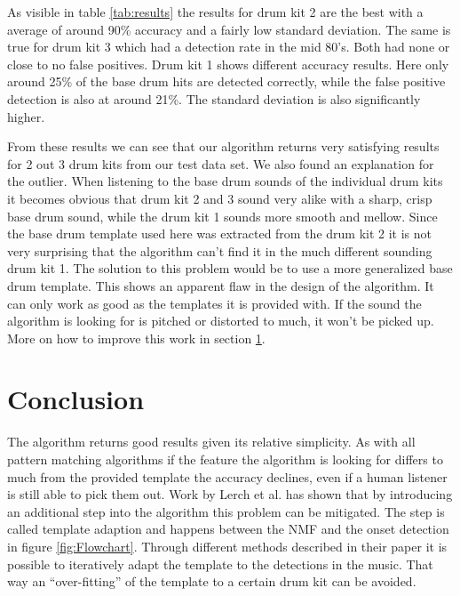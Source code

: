 \documentclass{article}
\begin{document}
As visible in table \ref{tab:results} the results for drum kit 2 are the best with a average of around 90\% accuracy and a fairly low standard deviation.
The same is true for drum kit 3 which had a detection rate in the mid 80's.
Both had none or close to no false positives.
Drum kit 1 shows different accuracy results.
Here only around 25\% of the base drum hits are detected correctly, while the false positive detection is also at around 21\%.
The standard deviation is also significantly higher.

From these results we can see that our algorithm returns very satisfying results for 2 out 3 drum kits from our test data set.
We also found an explanation for the outlier.
When listening to the base drum sounds of the individual drum kits it becomes obvious that drum kit 2 and 3 sound very alike with a sharp, crisp base drum sound, while the drum kit 1 sounds more smooth and mellow.
Since the base drum template used here was extracted from the drum kit 2 it is not very surprising that the algorithm can't find it in the much different sounding drum kit 1.
The solution to this problem would be to use a more generalized base drum template.
This shows an apparent flaw in the design of the algorithm.
It can only work as good as the templates it is provided with.
If the sound the algorithm is looking for is pitched or distorted to much, it won't be picked up.
More on how to improve this work in section \ref{sec:conclusion}.






\section{Conclusion}
\label{sec:conclusion}

The algorithm returns good results given its relative simplicity.
As with all pattern matching algorithms if the feature the algorithm is looking for differs to much from the provided template the accuracy declines, even if a human listener is still able to pick them out.
Work by Lerch et al. \cite{lerch2015} has shown that by introducing an additional step into the algorithm this problem can be mitigated.
The step is called template adaption and happens between the NMF and the onset detection in figure \ref{fig:Flowchart}.
Through different methods described in their paper it is possible to iteratively adapt the template to the detections in the music.
That way an ``over-fitting'' of the template to a certain drum kit can be avoided.
\end{document}
